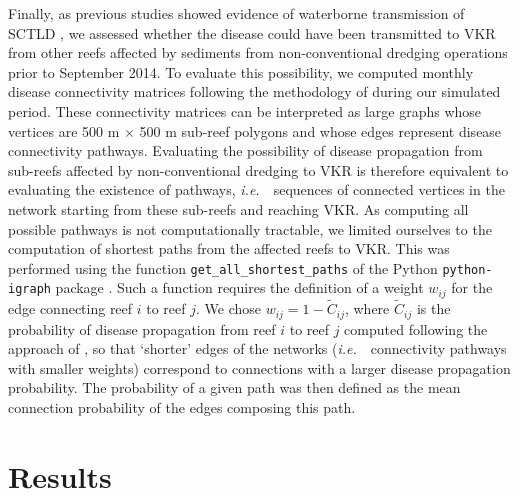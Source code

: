 \documentclass[preprint,12pt,authoryear]{elsarticle}
\newcommand{\ie}{{\it i.e.}\ }
\begin{document}
Finally, as previous studies showed evidence of waterborne transmission of SCTLD \citep{aeby2019pathogenesis, dobbelaere2020coupled,eaton2021measuring, meiling2021variable}, we assessed whether the disease could have been transmitted to VKR from other reefs affected by sediments from non-conventional dredging operations prior to September 2014. To evaluate this possibility, we computed monthly disease connectivity matrices following the methodology of \cite{dobbelaere2020coupled} during our simulated period. These connectivity matrices can be interpreted as large graphs whose vertices are 500 m $\times$ 500 m sub-reef polygons and whose edges represent disease connectivity pathways. Evaluating the possibility of disease propagation from sub-reefs affected by non-conventional dredging to VKR is therefore equivalent to evaluating the existence of pathways, \ie~sequences of connected vertices in the network starting from these sub-reefs and reaching VKR. As computing all possible pathways is not computationally tractable, we limited ourselves to the computation of shortest paths from the affected reefs to VKR. This was performed using the function \texttt{get\_all\_shortest\_paths} of the Python \texttt{python-igraph} package \citep{csardi2006igraph}. Such a function requires the definition of a weight $w_{ij}$ for the edge connecting reef $i$ to reef $j$. We chose $w_{ij} = 1-\tilde{C}_{ij}$, where $\tilde{C}_{ij}$ is the probability of disease propagation from reef $i$ to reef $j$ computed following the approach of \cite{dobbelaere2020coupled}, so that `shorter' edges of the networks (\ie~connectivity pathways with smaller weights) correspond to connections with a larger disease propagation probability. The probability of a given path was then defined as the mean connection probability of the edges composing this path.


\section{Results}
\end{document}
